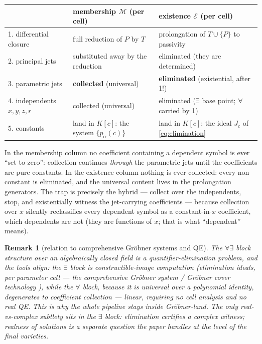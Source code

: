 \documentclass[11pt]{article}
\newcommand{\Mem}{\mathcal{M}}
\newcommand{\Ex}{\mathcal{E}}
\newtheorem{remark}{Remark}
\begin{document}
\begin{center}
\small
\begin{tabular}{lll}
\toprule
 & membership $\Mem$ (per cell) & existence $\Ex$ (per cell) \\
\midrule
1. differential closure & full reduction of $P$ by $T$ &
  prolongation of $T\cup\{P\}$ to passivity \\
2. principal jets & substituted away by the reduction &
  eliminated (they are determined) \\
3. parametric jets & \textbf{collected} (universal) &
  \textbf{eliminated} (existential, after 1!) \\
4. independents $x,y,z,r$ & collected (universal) &
  eliminated ($\exists$ base point; $\forall$ carried by 1) \\
5. constants & land in $K[c]$: the system $\{p_\alpha(c)\}$ &
  land in $K[c]$: the ideal $J_c$ of \eqref{eq:elimination} \\
\bottomrule
\end{tabular}
\end{center}

In the membership column no coefficient containing a dependent symbol is ever
``set to zero'': collection continues \emph{through} the parametric jets until
the coefficients are pure constants. In the existence column nothing is ever
collected: every non-constant is eliminated, and the universal content lives
in the prolongation generators. The trap is precisely the hybrid --- collect
over the independents, stop, and existentially witness the jet-carrying
coefficients --- because collection over $x$ silently reclassifies every
dependent symbol as a constant-in-$x$ coefficient, which dependents are not
(they are functions of $x$; that is what ``dependent'' means).

\begin{remark}[relation to comprehensive Gr\"obner systems and QE]
The $\forall\exists$ block structure over an algebraically closed field is a
quantifier-elimination problem, and the tools align: the $\exists$ block is
constructible-image computation (elimination ideals, per parameter cell ---
the comprehensive Gr\"obner system / Gr\"obner cover technology
\cite{weispfenning,montes-wibmer}), while the $\forall$ block, because it is
universal over a \emph{polynomial identity}, degenerates to coefficient
collection --- linear, requiring no cell analysis and no real QE. This is why
the whole pipeline stays inside Gr\"obner-land. The only real-vs-complex
subtlety sits in the $\exists$ block: elimination certifies a \emph{complex}
witness; realness of solutions is a separate question the paper handles at
the level of the final varieties.
\end{remark}
\end{document}
